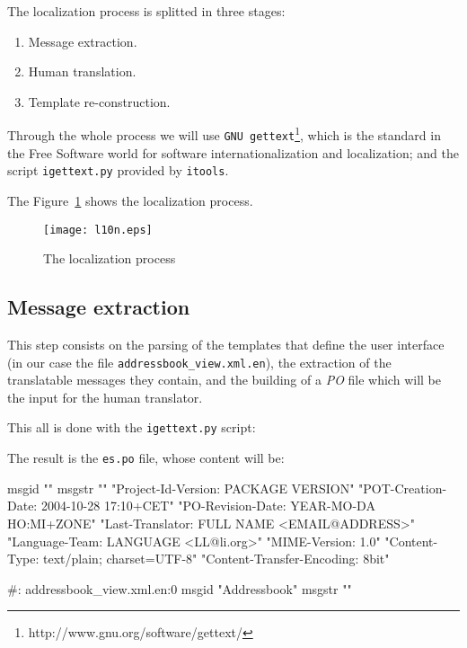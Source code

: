 The localization process is splitted in three stages:

\begin{enumerate}
  \item Message extraction.
  \item Human translation.
  \item Template re-construction.
\end{enumerate}

Through the whole process we will use {\tt GNU
gettext}\footnote{http://www.gnu.org/software/gettext/}, which is the
standard in the Free Software world for software internationalization
and localization; and the script {\tt igettext.py} provided by {\tt itools}.

The Figure~\ref{Figure: i18n} shows the localization process.

\begin{figure}
  \center
  \texttt{[image: l10n.eps]}
  \caption{The localization process}
  \label{Figure: i18n}
\end{figure}

\subsection{Message extraction}

This step consists on the parsing of the templates that define the user
interface (in our case the file {\tt addressbook\_view.xml.en}), the
extraction of the translatable messages they contain, and the building of
a {\em PO} file which will be the input for the human translator.

This all is done with the {\tt igettext.py} script:


The result is the {\tt es.po} file, whose content will be:

\begin{code}
    msgid ""
    msgstr ""
    "Project-Id-Version: PACKAGE VERSION\n"
    "POT-Creation-Date: 2004-10-28 17:10+CET\n"
    "PO-Revision-Date: YEAR-MO-DA HO:MI+ZONE\n"
    "Last-Translator: FULL NAME <EMAIL@ADDRESS>\n"
    "Language-Team: LANGUAGE <LL@li.org>\n"
    "MIME-Version: 1.0\n"
    "Content-Type: text/plain; charset=UTF-8\n"
    "Content-Transfer-Encoding: 8bit\n"

    #: addressbook_view.xml.en:0
    msgid "Addressbook"
    msgstr ""
\end{code}

